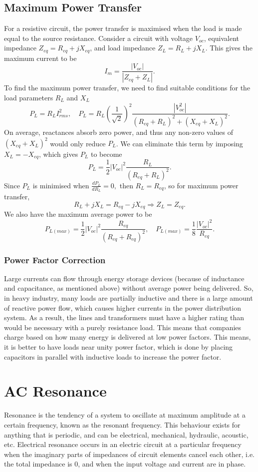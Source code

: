 \documentclass{article}
\begin{document}
\subsection{Maximum Power Transfer}
For a resistive circuit, the power transfer is maximised when the load is made equal to the source resistance. Consider a circuit with voltage $V_{oc}$, equivalent impedance $Z_{eq}=R_{eq}+jX_{eq}$, and load impedance $Z_L=R_L+jX_L$. This gives the maximum current to be 
\[
    I_m=\frac{\left| V_{oc} \right|}{\left| Z_{eq}+Z_L \right|}.
\]
To find the maximum power transfer, we need to find suitable conditions for the load parameters $R_L$ and $X_L$
\[
    P_L=R_LI^2_{rms},\quad P_L=R_L \left( \frac{1}{\sqrt{2}} \right)^2 \frac{\left| V_{oc}^2 \right|}{\left( R_{eq}+R_L \right)^2+\left( X_{eq}+X_L \right)^2}.
\]
On average, reactances absorb zero power, and thus any non-zero values of $\left( X_{eq}+X_L \right)^2$ would only reduce $P_L$. We can eliminate this term by imposing $X_L=-X_{eq}$, which gives $P_L$ to become 
\[
    P_L=\frac{1}{2}\left| V_{oc} \right|^2 \frac{R_L}{\left( R_{eq}+R_L \right)^2}.
\]
Since $P_L$ is minimised when $\frac{d P_L}{d R_L}=0,$ then $R_L=R_{eq}$, so for maximum power transfer,
\[
    R_L+jX_L=R_{eq}-jX_{eq}\Rightarrow Z_L=Z_{eq}.
\]
We also have the maximum average power to be 
\[
    P_{L(max)}=\frac{1}{2}\left| V_{oc} \right|^2 \frac{R_{eq}}{\left( R_{eq}+R_{eq} \right)^2},\quad P_{L(max)}=\frac{1}{8}\frac{\left| V_{oc} \right|^2}{R_{eq}}.
\]

\subsubsection{Power Factor Correction}
Large currents can flow through energy storage devices (because of inductance and capacitance, as mentioned above) without average power being delivered. So, in heavy industry, many loads are partially inductive and there is a large amount of reactive power flow, which causes higher currents in the power distribution system. As a result, the lines and transformers must have a higher rating than would be necessary with a purely resistance load. This means that companies charge based on how many energy is delivered at low power factors. This means, it is better to have loads near unity power factor, which is done by placing capacitors in parallel with inductive loads to increase the power factor.

\section{AC Resonance}
Resonance is the tendency of a system to oscillate at maximum amplitude at a certain frequency, known as the resonant frequency. This behaviour exists for anything that is periodic, and can be electrical, mechanical, hydraulic, acoustic, etc. Electrical resonance occurs in an electric circuit at a particular frequency when the imaginary parts of impedances of circuit elements cancel each other, i.e. the total impedance is 0, and when the input voltage and current are in phase.
\end{document}
